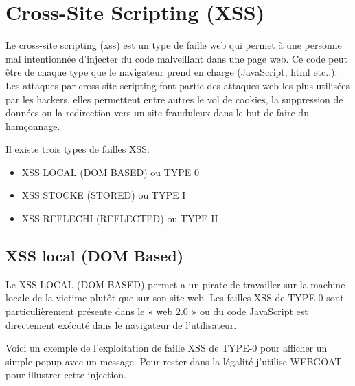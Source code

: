 

\newpage
\section{Cross-Site Scripting (XSS)}\label{vulnerabilites:web:xss}

Le cross-site scripting (xss) est un type de faille web qui permet à une personne mal intentionnée d'injecter du code malveillant dans une page web. Ce code peut être de chaque type que le navigateur prend en charge (JavaScript, html etc..). Les attaques par cross-site scripting font partie des attaques web les plus utilisées par les hackers, elles permettent entre autres le vol de cookies, la suppression de données ou la redirection vers un site frauduleux dans le but de faire du hamçonnage.

\bigskip

\begin{flushleft}
Il existe trois types de failles XSS:
\end{flushleft}
\begin{itemize}
\item XSS LOCAL (DOM BASED) ou TYPE 0
\item XSS STOCKE (STORED) ou TYPE I
\item XSS REFLECHI (REFLECTED) ou TYPE II
\end{itemize}

\bigskip

\subsection{XSS local (DOM Based)}\label{vulnerabilites:web:xss:dom}

Le XSS LOCAL (DOM BASED) permet a un pirate de travailler sur la machine locale de la victime plutôt que sur son site web. Les failles XSS de TYPE 0 sont particulièrement présente dans le « web 2.0 » ou du code JavaScript est directement exécuté dans le navigateur de l'utilisateur.

\begin{flushleft}
Voici un exemple de l'exploitation de faille XSS de TYPE-0 pour afficher un simple popup avec un message. Pour rester dans la légalité j'utilise WEBGOAT pour illustrer cette injection.
\end{flushleft}

